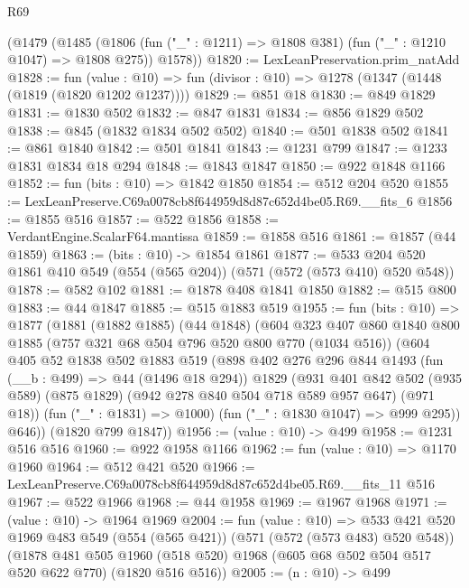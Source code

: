 \begin{lexlean}{R69}
\begin{coremodule}
    (@1479
      (@1485
        (@1806 (fun ("_" : @1211) => @1808 @381) (fun ("_" : @1210 @1047) => @1808 @275))
        @1578))
@1820 := LexLeanPreservation.prim_natAdd
@1828 := fun (value : @10) =>
  fun (divisor : @10) => @1278 (@1347 (@1448 (@1819 (@1820 @1202 @1237))))
@1829 := @851 @18
@1830 := @849 @1829
@1831 := @1830 @502
@1832 := @847 @1831
@1834 := @856 @1829 @502
@1838 := @845 (@1832 @1834 @502 @502)
@1840 := @501 @1838 @502
@1841 := @861 @1840
@1842 := @501 @1841
@1843 := @1231 @799
@1847 := @1233 @1831 @1834 @18 @294
@1848 := @1843 @1847
@1850 := @922 @1848 @1166
@1852 := fun (bits : @10) => @1842 @1850
@1854 := @512 @204 @520
@1855 := LexLeanPreserve.C69a0078cb8f644959d8d87c652d4be05.R69.__fits_6
@1856 := @1855 @516
@1857 := @522 @1856
@1858 := VerdantEngine.ScalarF64.mantissa
@1859 := @1858 @516
@1861 := @1857 (@44 @1859)
@1863 := (bits : @10) -> @1854 @1861
@1877 := @533 @204 @520 @1861 @410 @549 (@554 (@565 @204)) (@571 (@572 (@573 @410) @520 @548))
@1878 := @582 @102
@1881 := @1878 @408 @1841 @1850
@1882 := @515 @800
@1883 := @44 @1847
@1885 := @515 @1883 @519
@1955 := fun (bits : @10) =>
  @1877
    (@1881
      (@1882 @1885)
      (@44 @1848)
      (@604
        @323
        @407
        @860
        @1840
        @800
        @1885
        (@757 @321 @68 @504 @796 @520 @800 @770 (@1034 @516))
        (@604
          @405
          @52
          @1838
          @502
          @1883
          @519
          (@898
            @402
            @276
            @296
            @844
            @1493
            (fun (__b : @499) => @44 (@1496 @18 @294))
            @1829
            (@931
              @401
              @842
              @502
              (@935 @589)
              (@875 @1829)
              (@942 @278 @840 @504 @718 @589 @957 @647)
              (@971 @18))
            (fun ("_" : @1831) => @1000)
            (fun ("_" : @1830 @1047) => @999 @295))
          @646))
      (@1820 @799 @1847))
@1956 := (value : @10) -> @499
@1958 := @1231 @516 @516
@1960 := @922 @1958 @1166
@1962 := fun (value : @10) => @1170 @1960
@1964 := @512 @421 @520
@1966 := LexLeanPreserve.C69a0078cb8f644959d8d87c652d4be05.R69.__fits_11 @516
@1967 := @522 @1966
@1968 := @44 @1958
@1969 := @1967 @1968
@1971 := (value : @10) -> @1964 @1969
@2004 := fun (value : @10) =>
  @533
    @421
    @520
    @1969
    @483
    @549
    (@554 (@565 @421))
    (@571 (@572 (@573 @483) @520 @548))
    (@1878
      @481
      @505
      @1960
      (@518 @520)
      @1968
      (@605 @68 @502 @504 @517 @520 @622 @770)
      (@1820 @516 @516))
@2005 := (n : @10) -> @499

\end{coremodule}
\end{lexlean}
